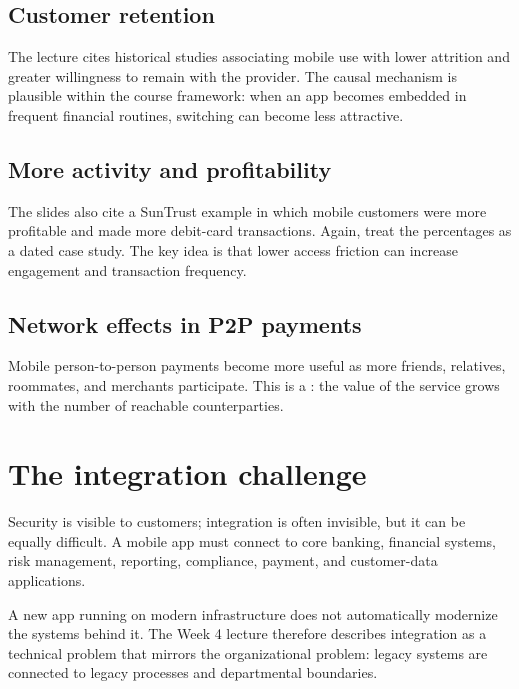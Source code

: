 \subsection{Customer retention}

The lecture cites historical studies associating mobile use with lower attrition and greater willingness to remain with the provider. The causal mechanism is plausible within the course framework: when an app becomes embedded in frequent financial routines, switching can become less attractive.

\subsection{More activity and profitability}

The slides also cite a SunTrust example in which mobile customers were more profitable and made more debit-card transactions. Again, treat the percentages as a dated case study. The key idea is that lower access friction can increase engagement and transaction frequency.

\subsection{Network effects in P2P payments}

Mobile person-to-person payments become more useful as more friends, relatives, roommates, and merchants participate. This is a : the value of the service grows with the number of reachable counterparties.

\section{The integration challenge}

Security is visible to customers; integration is often invisible, but it can be equally difficult. A mobile app must connect to core banking, financial systems, risk management, reporting, compliance, payment, and customer-data applications.

A new app running on modern infrastructure does not automatically modernize the systems behind it. The Week 4 lecture therefore describes integration as a technical problem that mirrors the organizational problem: legacy systems are connected to legacy processes and departmental boundaries.

